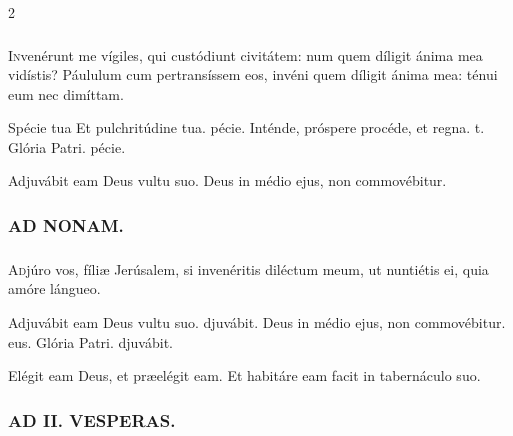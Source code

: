 \documentclass[9pt,twoside]{extarticle}
\begin{document}
\begin{multicols}{2}
\subsubsection*{}
\lettrine{I}nvenérunt me vígiles, qui custódiunt civitátem: num quem díligit ánima mea vidístis? Páululum cum pertransíssem eos, invéni quem díligit ánima mea: ténui eum nec dimíttam.

\begin{tightlist}{}
\item {} Spécie tua \textred{*} Et pulchritúdine tua. pécie.  Inténde, próspere procéde, et regna. t. Glória Patri. pécie.
\item {} Adjuvábit eam Deus vultu suo.  Deus in médio ejus, non commovébitur.
\end{tightlist}

\subsubsection*{\center \textsc{AD NONAM.}}
\subsubsection*{}
\lettrine{A}djúro vos, fíliæ Jerúsalem, si invenéritis diléctum meum, ut nuntiétis ei, quia amóre lángueo.

\begin{tightlist}{}
\item {} Adjuvábit eam \textred{*} Deus vultu suo. djuvábit.  Deus in médio ejus, non commovébitur. eus. Glória Patri. djuvábit.
\item {} Elégit eam Deus, et præelégit eam.  Et habitáre eam facit in tabernáculo suo.
\end{tightlist}

\subsubsection*{\center \textsc{AD II. VESPERAS.}}
\begin{tightlist}{}
\item {}
\end{tightlist}


\end{multicols}
\end{document}
